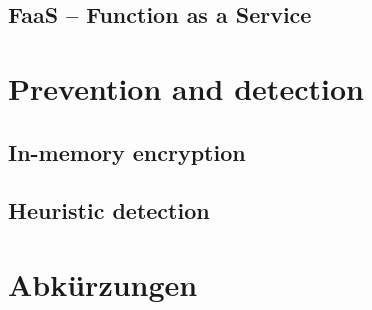 \documentclass[conference,compsoc,final,a4paper]{IEEEtran}
\begin{document}
\subsection{FaaS -- Function as a Service}

\section{Prevention and detection}
\subsection{In-memory encryption}
\subsection{Heuristic detection}

\section*{Abkürzungen}

\begin{acronym}[IEEE]
\end{acronym}

\printbibliography
\end{document}

